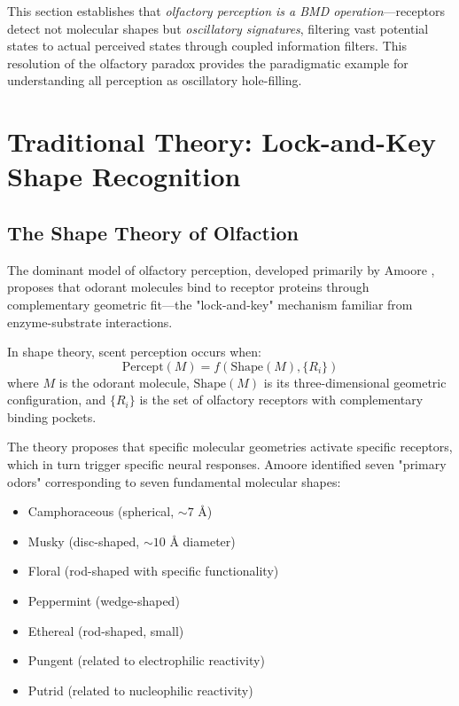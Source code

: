 This section establishes that \textit{olfactory perception is a BMD operation}—receptors detect not molecular shapes but \textit{oscillatory signatures}, filtering vast potential states to actual perceived states through coupled information filters. This resolution of the olfactory paradox provides the paradigmatic example for understanding all perception as oscillatory hole-filling.

\section{Traditional Theory: Lock-and-Key Shape Recognition}

\subsection{The Shape Theory of Olfaction}

The dominant model of olfactory perception, developed primarily by Amoore \cite{amoore1964stereochemical}, proposes that odorant molecules bind to receptor proteins through complementary geometric fit—the "lock-and-key" mechanism familiar from enzyme-substrate interactions.

\begin{definition}
\label{def:shape_theory}
In shape theory, scent perception occurs when:
\begin{equation}
\text{Percept}(M) = f(\text{Shape}(M), \{R_i\})
\end{equation}
where $M$ is the odorant molecule, $\text{Shape}(M)$ is its three-dimensional geometric configuration, and $\{R_i\}$ is the set of olfactory receptors with complementary binding pockets.
\end{definition}

The theory proposes that specific molecular geometries activate specific receptors, which in turn trigger specific neural responses. Amoore identified seven "primary odors" corresponding to seven fundamental molecular shapes:
\begin{itemize}
\item Camphoraceous (spherical, $\sim 7$ Å)
\item Musky (disc-shaped, $\sim 10$ Å diameter)
\item Floral (rod-shaped with specific functionality)
\item Peppermint (wedge-shaped)
\item Ethereal (rod-shaped, small)
\item Pungent (related to electrophilic reactivity)
\item Putrid (related to nucleophilic reactivity)
\end{itemize}


